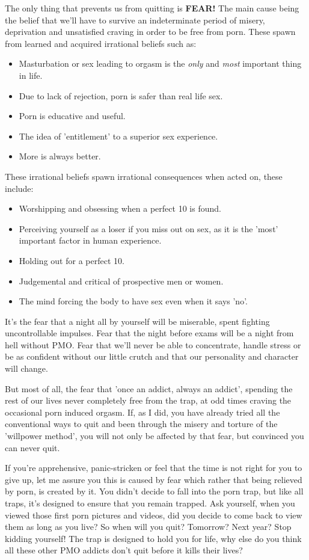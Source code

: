 \documentclass[easypeasy.tex]{subfiles}
\begin{document}
The only thing that prevents us from quitting is \textbf{FEAR!} The main cause being the belief that we'll have to survive an indeterminate period of misery, deprivation and unsatisfied craving in order to be free from porn. These spawn from learned and acquired irrational beliefs such as:
    \begin{itemize}
      \item Masturbation or sex leading to orgasm is the \textit{only} and \textit{most} important thing in life.
      \item Due to lack of rejection, porn is safer than real life sex.
      \item Porn is educative and useful.
      \item The idea of 'entitlement' to a superior sex experience.
      \item More is always better.
    \end{itemize}
These irrational beliefs spawn irrational consequences when acted on, these include:
  \begin{itemize}
    \item Worshipping and obsessing when a perfect 10 is found.
    \item Perceiving yourself as a loser if you miss out on sex, as it is the 'most' important factor in human experience.
    \item Holding out for a perfect 10.
    \item Judgemental and critical of prospective men or women.
    \item The mind forcing the body to have sex even when it says 'no'.
  \end{itemize}

It's the fear that a night all by yourself will be miserable, spent fighting uncontrollable impulses. Fear that the night before exams will be a night from hell without PMO. Fear that we'll never be able to concentrate, handle stress or be as confident without our little crutch and that our personality and character will change.

But most of all, the fear that 'once an addict, always an addict', spending the rest of our lives never completely free from the trap, at odd times craving the occasional porn induced orgasm. If, as I did, you have already tried all the conventional ways to quit and been through the misery and torture of the 'willpower method', you will not only be affected by that fear, but convinced you can never quit.

If you're apprehensive, panic-stricken or feel that the time is not right for you to give up, let me assure you this is caused by fear which rather that being relieved by porn, is created by it. You didn't decide to fall into the porn trap, but like all traps, it's designed to ensure that you remain trapped. Ask yourself, when you viewed those first porn pictures and videos, did you decide to come back to view them as long as you live? So when will you quit? Tomorrow? Next year? Stop kidding yourself! The trap is designed to hold you for life, why else do you think all these other PMO addicts don't quit before it kills their lives?
\end{document}
